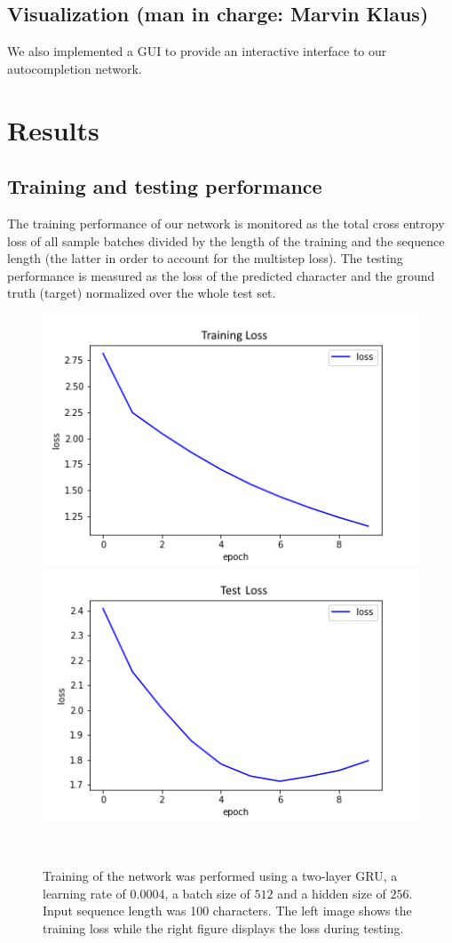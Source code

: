 \documentclass[11pt,a4paper,bibliography=totocnumbered,listof=totocnumbered]{scrartcl}
\begin{document}
\subsection{Visualization \small{(man in charge: Marvin Klaus)}}
We also implemented a GUI to provide an interactive interface to our autocompletion network.  

\pagebreak

%
\section{Results} \label{sec:res}

\subsection{Training and testing performance}
The training performance of our network is monitored as the total cross entropy loss of all sample batches divided by the length of the training and the sequence length (the latter in order to account for the multistep loss). The testing performance is measured as the loss of the predicted character and the ground truth (target) normalized over the whole test set. 


\begin{figure}[H]
   \begin{minipage}{\textwidth}
     \centering
     \includegraphics[width=.4\textwidth]{loss_train_hs256_slow}
     \includegraphics[width=.4\textwidth]{loss_test_hs256_slow}
     \caption{Training of the network was performed using a two-layer GRU, a learning rate of $0.0004$, a batch size of $512$ and a hidden size of $256$. Input sequence length was 100 characters. The left image shows the training loss while the right figure displays the loss during testing.}
     \label{fig:loss1}
   \end{minipage}\\[1em]   
\end{figure}
\end{document}
